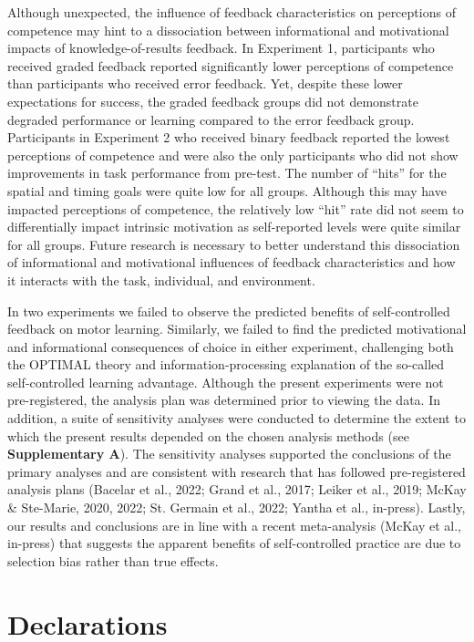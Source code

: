 \documentclass[
  man, donotrepeattitle,floatsintext]{apa7}
\begin{document}
Although unexpected, the influence of feedback characteristics on perceptions of competence may hint to a dissociation between informational and motivational impacts of knowledge-of-results feedback. In Experiment 1, participants who received graded feedback reported significantly lower perceptions of competence than participants who received error feedback. Yet, despite these lower expectations for success, the graded feedback groups did not demonstrate degraded performance or learning compared to the error feedback group. Participants in Experiment 2 who received binary feedback reported the lowest perceptions of competence and were also the only participants who did not show improvements in task performance from pre-test. The number of ``hits'' for the spatial and timing goals were quite low for all groups. Although this may have impacted perceptions of competence, the relatively low ``hit'' rate did not seem to differentially impact intrinsic motivation as self-reported levels were quite similar for all groups. Future research is necessary to better understand this dissociation of informational and motivational influences of feedback characteristics and how it interacts with the task, individual, and environment.

In two experiments we failed to observe the predicted benefits of self-controlled feedback on motor learning. Similarly, we failed to find the predicted motivational and informational consequences of choice in either experiment, challenging both the OPTIMAL theory and information-processing explanation of the so-called self-controlled learning advantage. Although the present experiments were not pre-registered, the analysis plan was determined prior to viewing the data. In addition, a suite of sensitivity analyses were conducted to determine the extent to which the present results depended on the chosen analysis methods (see \textbf{Supplementary A}). The sensitivity analyses supported the conclusions of the primary analyses and are consistent with research that has followed pre-registered analysis plans (Bacelar et al., 2022; Grand et al., 2017; Leiker et al., 2019; McKay \& Ste-Marie, 2020, 2022; St. Germain et al., 2022; Yantha et al., in-press). Lastly, our results and conclusions are in line with a recent meta-analysis (McKay et al., in-press) that suggests the apparent benefits of self-controlled practice are due to selection bias rather than true effects.

\vspace{10ex}

\hypertarget{declarations}{%
\section{Declarations}\label{declarations}}
\end{document}
